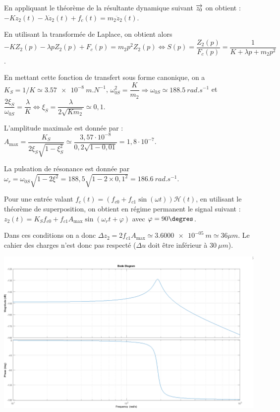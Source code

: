 \documentclass[10pt,fleqn]{article} %
\begin{document}
En appliquant le théorème de la résultante dynamique suivant $\overrightarrow{z_0}$ on obtient : $-Kz_2(t)-\lambda \dot{z}_2(t)+f_c(t)=m_2\ddot{z}_2(t)$.

En utilisant la transformée de Laplace, on obtient alors 
$-KZ_2(p)-\lambda p{Z}_2(p)+F_c(p)=m_2p^2{Z}_2(p) \Leftrightarrow S(p)=\dfrac{Z_2(p)}{F_c(p)}=\dfrac{1}{K+\lambda p  + m_2 p^2}
$.

En mettant cette fonction de transfert sous forme canonique, on a 
$K_S =1/K \simeq \SI{3,57e-8}{m.N^{-1}}$, 
$\omega_{0S}^2 = \dfrac{K}{m_2} \Rightarrow \omega_{0S}\simeq \SI{188,5}{rad.s^{-1}}$ et 
$\dfrac{2\xi_S}{\omega_{0S}} = \dfrac{\lambda}{K} \Leftrightarrow \xi_S = \dfrac{\lambda }{2\sqrt{Km_2}} \simeq 0,1$.

L'amplitude maximale est donnée par : $A_{\text{max}}=\dfrac{K_S}{2\xi_S\sqrt{1-\xi_S^2}}\simeq \dfrac{3,57\cdot 10^{-8}}{0,2\sqrt{1-0,01}}=1,8\cdot 10^{-7}$.



La pulsation de résonance est donnée par $\omega_r = \omega_{0S} \sqrt{1-2\xi^2} = 188,5\sqrt{1-2\times 0,1^2}=\SI{186,6}{rad.s^{-1}}$.



Pour une entrée valant $f_c(t)=\left(f_{c0}+f_{c1}\sin \left(\omega t\right)\right) \mathcal{H}(t)$, en utilisant le théorème de superposition, on obtient en régime permanent le signal suivant : 
$z_2(t)=K_S f_{c0}  + f_{c1} A_{\text{max}} \sin \left(\omega_r t+\varphi\right)$ avec $\varphi=90\degres$.

Dans ces conditions on a donc $\Delta z_2 = 2 f_{c1} A_{\text{max}}\simeq \SI{3.6000e-05}{m} \simeq {36}{\mu m} $. Le cahier des charges n'est donc pas respecté ($\Delta u$ doit être inférieur à $\SI{30}{\mu m}$).
\begin{center}
\includegraphics[width=.8\linewidth]{images/fig_08}
\end{center}
\end{document}
